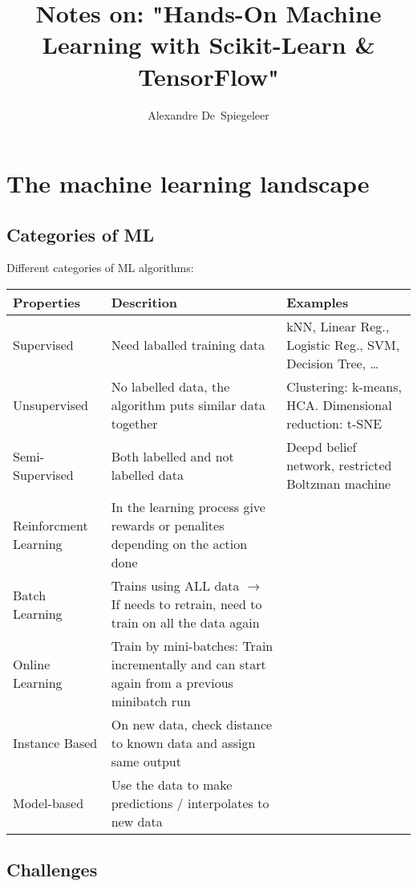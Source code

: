 \documentclass{book}
\title{Notes on: "Hands-On Machine Learning with Scikit-Learn \& TensorFlow"}
\author{Alexandre De~Spiegeleer}
\begin{document}
\maketitle

\chapter{The machine learning landscape}

\section{Categories of ML}
Different categories of ML algorithms:

\begin{tabular}{p{}p{}p{}}
  \textbf{Properties} & \textbf{Descrition} & \textbf{Examples} \\
  \hline
  Supervised &  Need laballed training data & kNN, Linear Reg., Logistic Reg., SVM, Decision Tree, \ldots \\
  Unsupervised & No labelled data, the algorithm puts similar data together & Clustering: k-means, HCA. Dimensional reduction: t-SNE\\
  Semi-Supervised & Both labelled and not labelled data & Deepd belief network, restricted Boltzman machine \\
  Reinforcment Learning & In the learning process give rewards or penalites depending on the action done & \\
  \hline\hline
  Batch Learning & Trains using ALL data $\rightarrow$ If needs to retrain, need to train on all the data again & \\
  Online Learning & Train by mini-batches: Train incrementally and can start again from a previous minibatch run & \\
  \hline\hline
  Instance Based & On new data, check distance to known data and assign same output &\\
  Model-based & Use the data to make predictions / interpolates to new data & \\
\end{tabular}

\section{Challenges}
\end{document}

